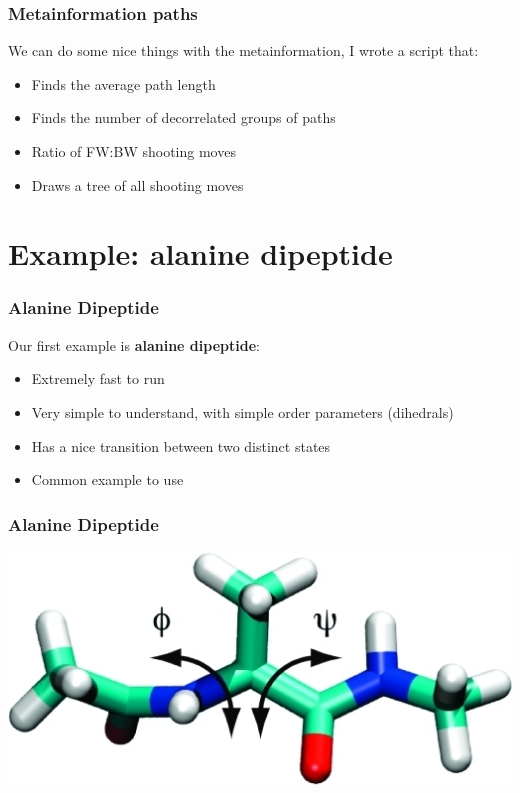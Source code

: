 \documentclass[hyperref={pdfpagelabels=false}]{beamer}
\begin{document}
\begin{frame}
\frametitle{Metainformation paths} 
We can do some nice things with the metainformation, I wrote a script that:
\begin{itemize}
\item Finds the average path length
\item Finds the number of decorrelated groups of paths
\item Ratio of FW:BW shooting moves
\item Draws a tree of all shooting moves
\end{itemize}
\end{frame}

\section{Example: alanine dipeptide} 
\setcounter{subsection}{1}

\begin{frame}
\frametitle{Alanine Dipeptide} 
Our first example is \textbf{alanine dipeptide}:
\begin{itemize}
\item Extremely fast to run
\item Very simple to understand, with simple order parameters (dihedrals)
\item Has a nice transition between two distinct states
\item Common example to use
\end{itemize}
\end{frame}

\begin{frame}
\frametitle{Alanine Dipeptide} 
\begin{center}
\includegraphics[scale=0.4]{images/alanine.png}
\end{center}
\end{frame}
\end{document}
